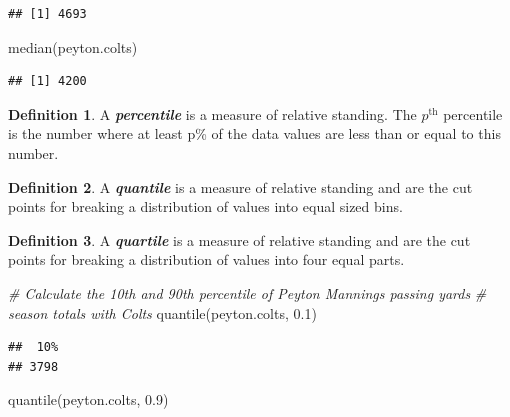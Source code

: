 \documentclass[
  11pt,
]{book}
\newenvironment{Shaded}{\begin{snugshade}}{\end{snugshade}}
\newcommand{\CommentTok}[1]{\textcolor[rgb]{0.56,0.35,0.01}{\textit{#1}}}
\newcommand{\FloatTok}[1]{\textcolor[rgb]{0.00,0.00,0.81}{#1}}
\newcommand{\FunctionTok}[1]{\textcolor[rgb]{0.00,0.00,0.00}{#1}}
\newcommand{\NormalTok}[1]{#1}
\theoremstyle{definition}
\newtheorem{definition}{Definition}[chapter]
\theoremstyle{definition}
\theoremstyle{definition}
\theoremstyle{definition}
\theoremstyle{remark}
\begin{document}
\begin{verbatim}
## [1] 4693
\end{verbatim}

\begin{Shaded}
\begin{Highlighting}[]
\FunctionTok{median}\NormalTok{(peyton.colts)}
\end{Highlighting}
\end{Shaded}

\begin{verbatim}
## [1] 4200
\end{verbatim}

\newpage

\begin{definition}
A \textbf{\emph{percentile}} is a measure of relative standing. The \(p^\text{th}\) percentile is the number where at least
p\% of the data values are less than or equal to this number.
\end{definition}

\begin{definition}
A \textbf{\emph{quantile}} is a measure of relative standing and are the cut points for breaking a distribution of values into equal sized bins.
\end{definition}

\begin{definition}
A \textbf{\emph{quartile}} is a measure of relative standing and are the cut points for breaking a distribution of values into four equal parts.
\end{definition}

\begin{Shaded}
\begin{Highlighting}[]
\CommentTok{\# Calculate the 10th and 90th percentile of Peyton Manning\textquotesingle{}s passing yards}
\CommentTok{\# season totals with Colts}
\FunctionTok{quantile}\NormalTok{(peyton.colts, }\FloatTok{0.1}\NormalTok{)}
\end{Highlighting}
\end{Shaded}

\begin{verbatim}
##  10% 
## 3798
\end{verbatim}

\begin{Shaded}
\begin{Highlighting}[]
\FunctionTok{quantile}\NormalTok{(peyton.colts, }\FloatTok{0.9}\NormalTok{)}
\end{Highlighting}
\end{Shaded}
\end{document}

